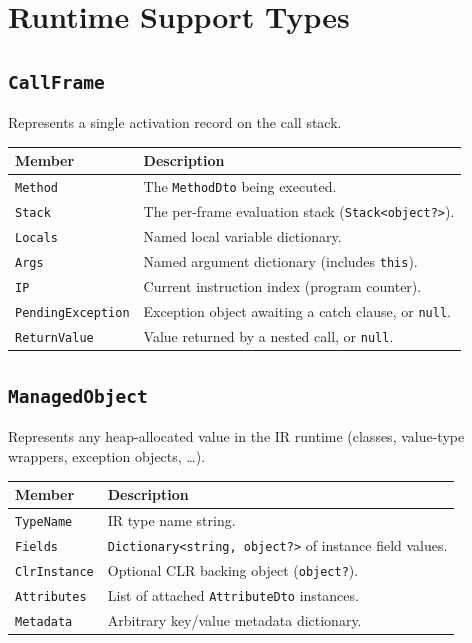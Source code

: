 \documentclass[11pt,a4paper]{article}
\newcommand{\code}[1]{\texttt{\small #1}}
\newcommand{\typename}[1]{\textcolor{typecolor}{\texttt{\small #1}}}
\begin{document}
\section{Runtime Support Types}

\subsection{\texttt{CallFrame}}

Represents a single activation record on the call stack.

\begin{longtable}{lp{9.5cm}}
  \toprule
  \textbf{Member} & \textbf{Description} \\
  \midrule
  \endhead
  \code{Method}           & The \typename{MethodDto} being executed. \\
  \code{Stack}            & The per-frame evaluation stack (\code{Stack<object?>}). \\
  \code{Locals}           & Named local variable dictionary. \\
  \code{Args}             & Named argument dictionary (includes \texttt{this}). \\
  \code{IP}               & Current instruction index (program counter). \\
  \code{PendingException} & Exception object awaiting a catch clause, or \code{null}. \\
  \code{ReturnValue}      & Value returned by a nested call, or \code{null}. \\
  \bottomrule
\end{longtable}

\subsection{\texttt{ManagedObject}}

Represents any heap-allocated value in the IR runtime (classes, value-type
wrappers, exception objects, \ldots).

\begin{longtable}{lp{9.5cm}}
  \toprule
  \textbf{Member} & \textbf{Description} \\
  \midrule
  \endhead
  \code{TypeName}    & IR type name string. \\
  \code{Fields}      & \code{Dictionary<string, object?>} of instance field values. \\
  \code{ClrInstance} & Optional CLR backing object (\code{object?}). \\
  \code{Attributes}  & List of attached \typename{AttributeDto} instances. \\
  \code{Metadata}    & Arbitrary key/value metadata dictionary. \\
  \bottomrule
\end{longtable}
\end{document}
